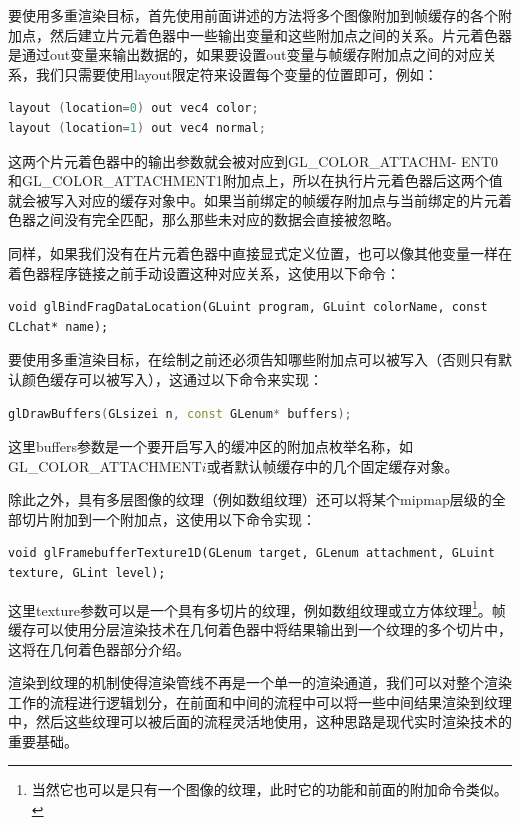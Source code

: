 要使用多重渲染目标，首先使用前面讲述的方法将多个图像附加到帧缓存的各个附加点，然后建立片元着色器中一些输出变量和这些附加点之间的关系。片元着色器是通过out变量来输出数据的，如果要设置out变量与帧缓存附加点之间的对应关系，我们只需要使用layout限定符来设置每个变量的位置即可，例如：

\begin{lstlisting}[language=C++]
layout (location=0) out vec4 color;
layout (location=1) out vec4 normal;
\end{lstlisting}

这两个片元着色器中的输出参数就会被对应到GL\_COLOR\_ATTACHM- ENT0和GL\_COLOR\_ATTACHMENT1附加点上，所以在执行片元着色器后这两个值就会被写入对应的缓存对象中。如果当前绑定的帧缓存附加点与当前绑定的片元着色器之间没有完全匹配，那么那些未对应的数据会直接被忽略。

同样，如果我们没有在片元着色器中直接显式定义位置，也可以像其他变量一样在着色器程序链接之前手动设置这种对应关系，这使用以下命令：

\begin{lstlisting}
void glBindFragDataLocation(GLuint program, GLuint colorName, const CLchat* name);
\end{lstlisting}

要使用多重渲染目标，在绘制之前还必须告知哪些附加点可以被写入（否则只有默认颜色缓存可以被写入），这通过以下命令来实现：

\begin{lstlisting}[language=C++]
glDrawBuffers(GLsizei n, const GLenum* buffers);
\end{lstlisting}

这里buffers参数是一个要开启写入的缓冲区的附加点枚举名称，如GL\_COLOR\_ATTACHMENT$i$或者默认帧缓存中的几个固定缓存对象。

除此之外，具有多层图像的纹理（例如数组纹理）还可以将某个mipmap层级的全部切片附加到一个附加点，这使用以下命令实现：

\begin{lstlisting}
void glFramebufferTexture1D​(GLenum target​, GLenum attachment​, GLuint texture​, GLint level​);
\end{lstlisting}

这里texture参数可以是一个具有多切片的纹理，例如数组纹理或立方体纹理\footnote{当然它也可以是只有一个图像的纹理，此时它的功能和前面的附加命令类似。}。帧缓存可以使用分层渲染技术在几何着色器中将结果输出到一个纹理的多个切片中，这将在几何着色器部分介绍。

渲染到纹理的机制使得渲染管线不再是一个单一的渲染通道，我们可以对整个渲染工作的流程进行逻辑划分，在前面和中间的流程中可以将一些中间结果渲染到纹理中，然后这些纹理可以被后面的流程灵活地使用，这种思路是现代实时渲染技术的重要基础。

